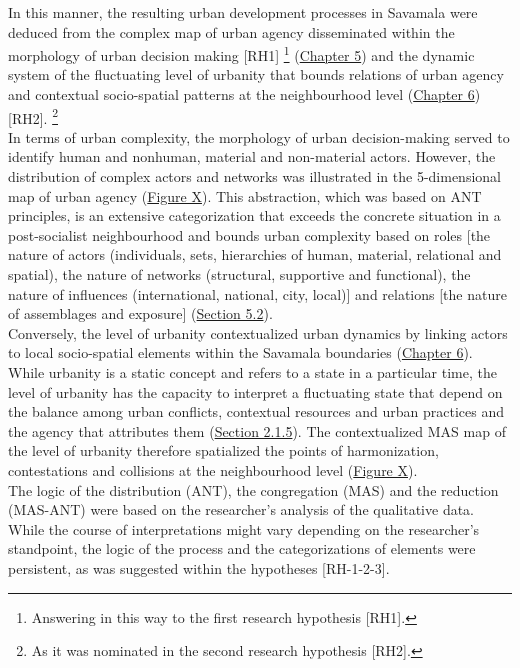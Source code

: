 \documentclass[11pt]{report}
\begin{document}
{{{In this manner, the resulting urban development processes in Savamala were deduced from the complex map of urban agency disseminated within the morphology of urban decision making [RH1]
\footnote{Answering in this way to the first research hypothesis [RH1].}
(\href{Chapter 5}{Chapter 5})
and the dynamic system of the fluctuating level of urbanity that bounds relations of urban agency and contextual socio-spatial patterns at the neighbourhood level
(\href{Chapter 6}{Chapter 6}) [RH2].
\footnote{As it was nominated in the second research hypothesis [RH2].}
\\

In terms of urban complexity, the morphology of urban decision-making served to identify human and nonhuman, material and non-material actors. However, the distribution of complex actors and networks was illustrated in the 5-dimensional map of urban agency (\href{Figure ANT diagram}{Figure X}).
This abstraction, which was based on ANT principles, is an extensive categorization that exceeds the concrete situation in a post-socialist neighbourhood and bounds urban complexity based on roles [the nature of actors (individuals, sets, hierarchies of human, material, relational and spatial), the nature of networks (structural, supportive and functional), the nature of influences (international, national, city, local)] and relations [the nature of assemblages and exposure] (\href{Section 5.2}{Section 5.2}).
\\

Conversely, the level of urbanity contextualized urban dynamics by linking actors to local socio-spatial elements within the Savamala boundaries  (\href{Chapter 6}{Chapter 6}). 
While urbanity is a static concept and refers to a state in a particular time, the level of urbanity has  the capacity to interpret a fluctuating state that depend on the balance among urban conflicts, contextual resources and urban practices and the agency that attributes them (\href{Section 2.1.5}{Section 2.1.5}).
The contextualized MAS map of the level of urbanity therefore spatialized the points of harmonization, contestations and collisions at the neighbourhood level (\href{Figure MAS diagram}{Figure X}).
\\

The logic of the distribution (ANT), the congregation (MAS) and the reduction (MAS-ANT) were based on the researcher's analysis of the qualitative data. While the course of interpretations might vary depending on the researcher's standpoint, the logic of the process and the categorizations of elements were persistent, as was suggested within the hypotheses [RH-1-2-3].

}}}
\end{document}
